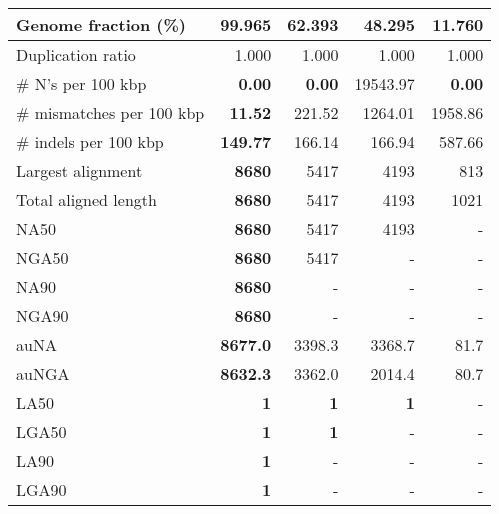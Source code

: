 \documentclass[12pt,a4paper]{article}
\begin{document}
\begin{table}[ht]
\begin{center}
\begin{tabular}{|l*{4}{|r}|}
Genome fraction (\%) & {\bf 99.965} & 62.393 & 48.295 & 11.760 \\ \hline
Duplication ratio & 1.000 & 1.000 & 1.000 & 1.000 \\ \hline
\# N's per 100 kbp & {\bf 0.00} & {\bf 0.00} & 19543.97 & {\bf 0.00} \\ \hline
\# mismatches per 100 kbp & {\bf 11.52} & 221.52 & 1264.01 & 1958.86 \\ \hline
\# indels per 100 kbp & {\bf 149.77} & 166.14 & 166.94 & 587.66 \\ \hline
Largest alignment & {\bf 8680} & 5417 & 4193 & 813 \\ \hline
Total aligned length & {\bf 8680} & 5417 & 4193 & 1021 \\ \hline
NA50 & {\bf 8680} & 5417 & 4193 & - \\ \hline
NGA50 & {\bf 8680} & 5417 & - & - \\ \hline
NA90 & {\bf 8680} & - & - & - \\ \hline
NGA90 & {\bf 8680} & - & - & - \\ \hline
auNA & {\bf 8677.0} & 3398.3 & 3368.7 & 81.7 \\ \hline
auNGA & {\bf 8632.3} & 3362.0 & 2014.4 & 80.7 \\ \hline
LA50 & {\bf 1} & {\bf 1} & {\bf 1} & - \\ \hline
LGA50 & {\bf 1} & {\bf 1} & - & - \\ \hline
LA90 & {\bf 1} & - & - & - \\ \hline
LGA90 & {\bf 1} & - & - & - \\ \hline
\end{tabular}
\end{center}
\end{table}
\end{document}
